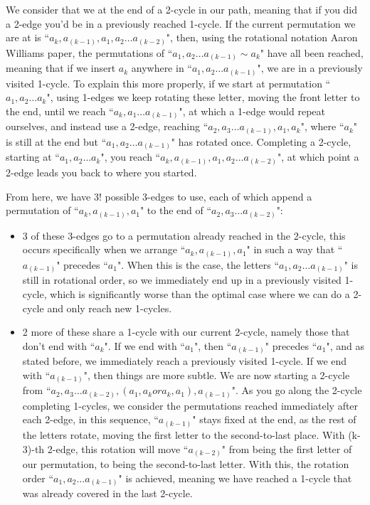 \documentclass{article}
\newcommand{\edit}[1]{}%
\newcommand{\rough}[1]{}%
\begin{document}
{We consider that we at the end of a 2-cycle in our path, meaning that if you did a 2-edge you'd be in a previously reached 1-cycle.\edit{ can be formalized by lemmas of 4.1} If the current permutation we are at is ``$a_k,a_{(k-1)},a_1, a_2 \dots a_{(k-2)}$", then, using the rotational notation Aaron Williams paper, the permutations of ``$a_1,a_2\dots  a_{(k-1)} \sim a_k$" have all been reached, meaning that if we insert $a_k$ anywhere in ``$a_1,a_2\dots  a_{(k-1)}$", we are in a previously visited 1-cycle. To explain this more properly, if we start at permutation ``$a_1,a_2\dots  a_k$", using 1-edges we keep rotating these letter, moving the front letter to the end, until we reach ``$a_k, a_1 \dots  a_{(k-1)}$", at which a 1-edge would repeat ourselves, and instead use a 2-edge, reaching ``$a_2,a_3 \dots  a_{(k-1)},a_1,a_k$", where ``$a_k$" is still at the end but ``$a_1,a_2\dots a_{(k-1)}$" has rotated once. Completing a 2-cycle, starting at ``$a_1,a_2\dots a_k$", you reach ``$a_k,a_{(k-1)},a_1, a_2 \dots  a_{(k-2)}$", at which point a 2-edge leads you back to where you started.\edit{ Rotational notation can be introduced better, or maybe avoided altogether; should be more concise/broken apart}

\vspace{1.75em}

\rough{3-edge shenanigans} From here, we have 3! possible 3-edges to use, each of which append a permutation of ``$a_k,a_(k-1),a_1$"  to the end of ``$a_2,a_3\dots  a_(k-2)$":

\begin{itemize}
    \item 3 of these 3-edges go to a permutation already reached in the 2-cycle, this occurs specifically when we arrange ``$a_k,a_(k-1),a_1$" in such a way that ``$a_(k-1)$" precedes ``$a_1$". When this is the case, the letters ``$a_1,a_2\dots  a_(k-1)$" is still in rotational order, so we  immediately end up in a previously visited 1-cycle, which is significantly worse than the optimal case where we can do a 2-cycle and only reach new 1-cycles.
    \item 2 more of these share a 1-cycle with our current 2-cycle, namely those that don't end with ``$a_k$". If we end with ``$a_1$", then ``$a_(k-1)$" precedes ``$a_1$", and as stated before, we immediately reach a previously visited 1-cycle. If we end with ``$a_{(k-1)}$", then things are more subtle. We are now starting a 2-cycle from ``$a_2,a_3\dots  a_{(k-2)}, (a_1,a_k or a_k,a_1), a_{(k-1)}$". As you go along the 2-cycle completing 1-cycles, we consider the permutations reached immediately after each 2-edge, in this sequence, ``$a_{(k-1)}$" stays fixed at the end, as the rest of the letters rotate, moving the first letter to the second-to-last place. With (k-3)-th 2-edge, this rotation will move ``$a_{(k-2)}$" from being the first letter of our permutation, to being the second-to-last letter. With this, the rotation order ``$a_1,a_2\dots  a_{(k-1)}$" is achieved, meaning we have reached a 1-cycle that was already covered in the last 2-cycle.
\end{itemize}

}
\end{document}
